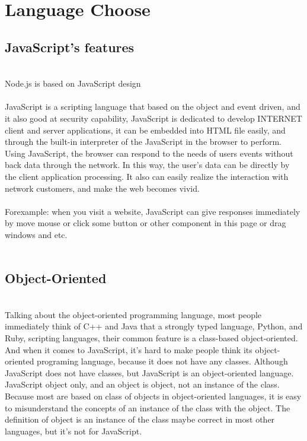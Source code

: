 \section{Language Choose}
\subsection{JavaScript’s  features}	\cite{7}
\\
Node.js is based on JavaScript design \\
\\
JavaScript is a scripting language that based on the object and event driven, and it also good at security capability, JavaScript is dedicated to develop INTERNET client and server applications, it can be embedded into HTML file easily, and through the built-in interpreter of the JavaScript in the browser to perform. Using JavaScript, the browser can respond to the needs of users events without back data through the network. In this way, the user's data can be directly by the client application processing. It also can easily realize the interaction with network customers, and make the web becomes vivid.\\
\\
Forexample: when you visit a website, JavaScript can give responses immediately by move mouse or click some button or other component in this page or drag windows and etc.\\
\\
\subsection{Object-Oriented}
\\
Talking about the object-oriented programming language, most people immediately think of C++ and Java that a strongly typed language, Python, and Ruby, scripting languages, their common feature is a class-based object-oriented. And when it comes to JavaScript, it's hard to make people think its object-oriented programing language, because it does not have any classes. Although JavaScript does not have classes, but JavaScript is an object-oriented language. JavaScript object only, and an object is object, not an instance of the class. Because most are based on class of objects in object-oriented languages, it is easy to misunderstand the concepts of an instance of the class with the object. The definition of object is an instance of the class maybe correct in most other languages, but it’s not for JavaScript.\\ 
\\
